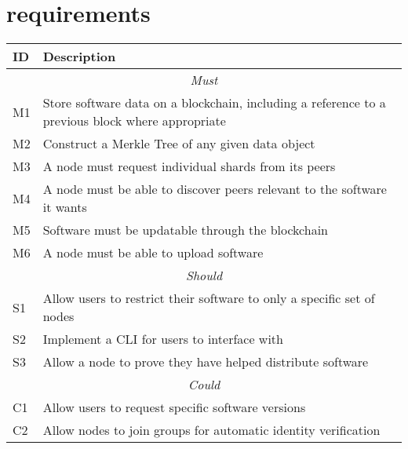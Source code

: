 
\section{requirements}

\begin{longtable}{ p{} p{} }
  \toprule
  \textbf{ID} & \textbf{Description}
  \\\midrule\midrule
  \multicolumn{2}{c}{\cellcolor{red!70}\textit{Must}}\\\midrule
  M1 & Store software data on a blockchain, including a reference to a previous block where appropriate\\
  M2 & Construct a Merkle Tree of any given data object\\
  M3 & A node must request individual shards from its peers\\
  M4 & A node must be able to discover peers relevant to the software it wants\\
  M5 & Software must be updatable through the blockchain\\
  M6 & A node must be able to upload software\\
  \midrule\multicolumn{2}{c}{\cellcolor{orange!70}\textit{Should}}\\\midrule
  S1 & Allow users to restrict their software to only a specific set of nodes\\
  S2 & Implement a CLI for users to interface with\\
  S3 & Allow a node to prove they have helped distribute software\\
  \midrule\multicolumn{2}{c}{\cellcolor{green}\textit{Could}}\\\midrule
  C1 & Allow users to request specific software versions\\
  C2 & Allow nodes to join groups for automatic identity verification\\
  \midrule
  \bottomrule
\end{longtable}